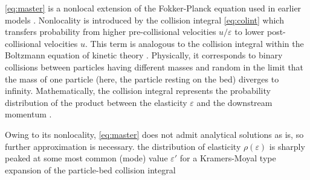 \DIFdelbegin {}\DIFdelend \DIFaddbegin {}\DIFaddend \ref{eq:master} is a nonlocal extension of the Fokker-Planck equation used in earlier \DIFdelbegin {}\DIFdelend \DIFaddbegin {}\DIFaddend models \citep{Fan2014,Ancey2014}. 
Nonlocality is introduced by the collision integral \DIFaddbegin {}\DIFaddend \ref{eq:colint} which transfers probability from higher pre-collisional velocities $u/\varepsilon$ to lower post-collisional velocities $u$.
This term is analogous to the collision integral within the Boltzmann equation of kinetic theory \citep{Duderstadt1979, Brilliantov2004}. Physically, it corresponds to binary collisions between particles having different masses and random \DIFdelbegin {}\DIFdelend \DIFaddbegin {}\DIFaddend in the limit that the mass of one particle (here, the particle resting on the bed) diverges to infinity.
Mathematically, the collision integral represents the probability distribution of the product between the elasticity $\varepsilon$ and the downstream momentum \DIFdelbegin {}\DIFdelend \DIFaddbegin {}\DIFaddend .


Owing to its nonlocality, \DIFdelbegin {}\DIFdelend \DIFaddbegin {}\DIFaddend \ref{eq:master} does not admit analytical solutions as is, so further approximation is necessary.
\DIFdelbegin {}\DIFdelend \DIFaddbegin {}\DIFaddend the distribution of elasticity $\rho(\varepsilon)$ is sharply peaked at some most common (mode) value $\varepsilon'$ \DIFdelbegin {}\DIFdelend \DIFaddbegin {}\DIFaddend for a Kramers-Moyal type expansion of the particle-bed collision integral \DIFdelbegin {}\DIFdelend \DIFaddbegin {}

